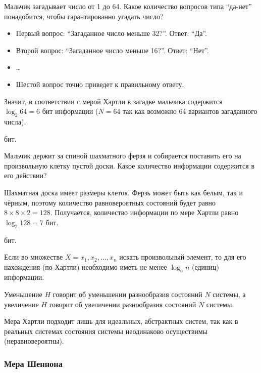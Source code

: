 \begin{example}
    \task%
    Мальчик загадывает число от 1 до 64. Какое количество вопросов типа \enquote{да-нет} понадобится, чтобы гарантированно угадать число?

    \solution%
    \begin{itemize}
        \item Первый вопрос: \enquote{Загаданное число меньше 32?}. Ответ: \enquote{Да}.
        \item Второй вопрос: \enquote{Загаданное число меньше 16?}. Ответ: \enquote{Нет}.
        \item \dots
        \item Шестой вопрос точно приведет к правильному ответу.
    \end{itemize}

    Значит, в соответствии с мерой Хартли в загадке мальчика содержится $\log_{2}64 = 6$ бит информации ($N = 64$ так как возможно 64 вариантов загаданного числа).

     бит.
\end{example}

\begin{example}
    \task%
    Мальчик держит за спиной шахматного ферзя и собирается поставить его на произвольную клетку пустой доски. Какое количество информации содержится в его действии?

    \solution%
    Шахматная доска имеет размеры  клеток.
    Ферзь может быть как белым, так и чёрным, поэтому количество равновероятных состояний будет равно $8 \times 8 \times 2 = 128$.
    Получается, количество информации по мере Хартли равно $\log_{2}128 = 7$ бит.

     бит.
\end{example}

\bigskip
Если во множестве $X = {x_1, x_2, \dots, x_n}$ искать произвольный элемент, то для его нахождения (по Хартли) необходимо иметь не менее $\log_{a}n$ (единиц) информации.

Уменьшение $H$ говорит об уменьшении разнообразия состояний $N$ системы, а увеличение $H$ говорит об увеличении разнообразия состояний $N$ системы.

Мера Хартли подходит лишь для идеальных, абстрактных систем, так как в реальных системах состояния системы неодинаково осуществимы (неравновероятны).

\subsubsection{Мера Шеннона}\label{subsubsec:shannon-measure}

